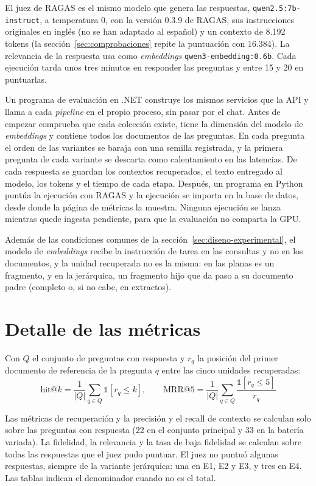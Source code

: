 El juez de RAGAS es el mismo modelo que genera las respuestas, \texttt{qwen2.5:7b-instruct}, a temperatura 0, con la versión 0.3.9 de RAGAS, sus instrucciones originales en inglés (no se han adaptado al español) y un contexto de 8.192 tokens (la sección~\ref{sec:comprobaciones} repite la puntuación con 16.384). La relevancia de la respuesta usa como \emph{embeddings} \texttt{qwen3-embedding:0.6b}. Cada ejecución tarda unos tres minutos en responder las preguntas y entre 15 y 20 en puntuarlas.

Un programa de evaluación en .NET construye los mismos servicios que la API y llama a cada \emph{pipeline} en el propio proceso, sin pasar por el chat. Antes de empezar comprueba que cada colección existe, tiene la dimensión del modelo de \emph{embeddings} y contiene todos los documentos de las preguntas. En cada pregunta el orden de las variantes se baraja con una semilla registrada, y la primera pregunta de cada variante se descarta como calentamiento en las latencias. De cada respuesta se guardan los contextos recuperados, el texto entregado al modelo, los tokens y el tiempo de cada etapa. Después, un programa en Python puntúa la ejecución con RAGAS y la ejecución se importa en la base de datos, desde donde la página de métricas la muestra. Ninguna ejecución se lanza mientras quede ingesta pendiente, para que la evaluación no comparta la GPU.

Además de las condiciones comunes de la sección~\ref{sec:diseno-experimental}, el modelo de \emph{embeddings} recibe la instrucción de tarea en las consultas y no en los documentos, y la unidad recuperada no es la misma: en las planas es un fragmento, y en la jerárquica, un fragmento hijo que da paso a su documento padre (completo o, si no cabe, en extractos).

\section{Detalle de las métricas}
\label{sec:metricas-detalle}

Con $Q$ el conjunto de preguntas con respuesta y $r_q$ la posición del primer documento de referencia de la pregunta $q$ entre las cinco unidades recuperadas:
\begin{equation}
  \mathrm{hit@}k = \frac{1}{|Q|}\sum_{q \in Q} \mathbb{1}[r_q \leq k], \qquad
  \mathrm{MRR@5} = \frac{1}{|Q|}\sum_{q \in Q} \frac{\mathbb{1}[r_q \leq 5]}{r_q}
  \label{eq:hit-mrr}
\end{equation}

Las métricas de recuperación y la precisión y el recall de contexto se calculan solo sobre las preguntas con respuesta (22 en el conjunto principal y 33 en la batería variada). La fidelidad, la relevancia y la tasa de baja fidelidad se calculan sobre todas las respuestas que el juez pudo puntuar. El juez no puntuó algunas respuestas, siempre de la variante jerárquica: una en E1, E2 y E3, y tres en E4. Las tablas indican el denominador cuando no es el total.

